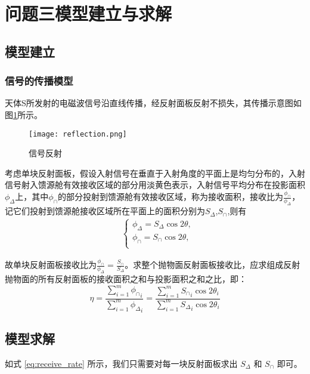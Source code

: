 \documentclass[withoutpreface,bwprint,fontset=macnew]{cumcmthesis} %
\begin{document}
		
	\section {问题三模型建立与求解}
	\subsection {模型建立}
	\subsubsection {信号的传播模型}
		天体S所发射的电磁波信号沿直线传播，经反射面板反射不损失，其传播示意图如图\ref {fig:reflection}所示。
		\begin{figure}[!h]
			\centering
			\texttt{[image: reflection.png]} %
			\caption{信号反射}
			\label{fig:reflection}
		\end{figure}
		考虑单块反射面板，假设入射信号在垂直于入射角度的平面上是均匀分布的，入射信号射入馈源舱有效接收区域的部分用淡黄色表示，入射信号平均分布在投影面积$\phi_\Delta$上，其中$\phi_\cap$的部分投射到馈源舱有效接收区域，称为接收面积，接收比为$\frac{\phi_\cap}{\phi_\Delta}$，记它们投射到馈源舱接收区域所在平面上的面积分别为$S_\Delta$,$S_\cap$,则有
		\begin{align*}
			&\begin{cases}
				\phi_\Delta = S_\Delta\cos 2 \theta,\\
				\phi_\cap = S_\cap\cos 2 \theta,\\
			\end{cases}
		\end{align*}
	
	
		故单块反射面板接收比为$\frac{\phi_\cap}{\phi_\Delta} = \frac{S_\cap}{S_\Delta}$。求整个抛物面反射面板接收比，应求组成反射抛物面的所有反射面板的接收面积之和与投影面积之和之比，即：
		\begin{equation}
			\eta = \frac{\sum\limits_{i=1}^{m}{\phi_\cap}_i}{\sum\limits_{i=1}^{m}{\phi_\Delta}_i} = \frac{\sum\limits_{i=1}^{m}{S_\cap}_i \cos 2 \theta_i}{\sum\limits_{i=1}^{m}{S_\Delta}_i \cos 2 \theta_i}
			\label{eq:receive_rate}
		\end{equation}
	
	\subsection	{模型求解}
	
		如式 \ref{eq:receive_rate} 所示，我们只需要对每一块反射面板求出 $S_\Delta$ 和 $S_\cap$ 即可。
		
\end{document}
